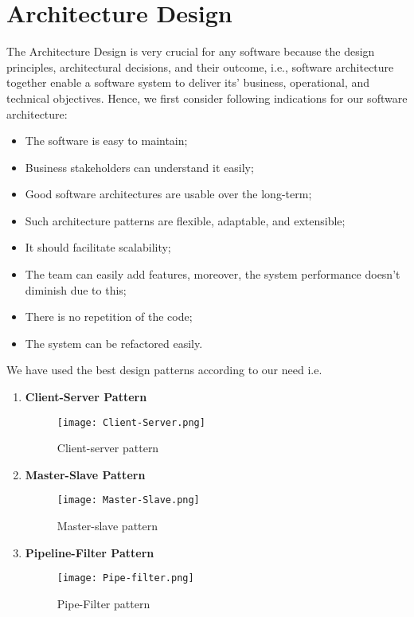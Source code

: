 \documentclass[12pt,oneside,a4paper]{report}
\begin{document}
\section{Architecture Design}
\fontsize{12pt}{10pt}\selectfont
The Architecture Design is very crucial for any software because the design principles, architectural decisions, and their outcome, i.e., software architecture together enable a software system to deliver its’ business, operational, and technical objectives. 
Hence, we first consider following indications for our software architecture:
\begin{itemize}
\item The software is easy to maintain;
\item    Business stakeholders can understand it easily;
\item    Good software architectures are usable over the long-term;
\item    Such architecture patterns are flexible, adaptable, and extensible;
\item    It should facilitate scalability;
\item    The team can easily add features, moreover, the system performance doesn’t diminish due to this;
\item    There is no repetition of the code;
\item    The system can be refactored easily.
\end{itemize}
\newpage
We have used the best design patterns according to our need i.e.\\
\begin{enumerate}
\item\textbf{\Large{Client-Server Pattern}}
\begin{figure}[h]
\centering
\texttt{[image: Client-Server.png]}
\caption{Client-server pattern}
\label{fig_ClientServer}
\end{figure}

\item\textbf{\Large{Master-Slave Pattern}}
\begin{figure}[h]
\centering
\texttt{[image: Master-Slave.png]}
\caption{Master-slave pattern}
\label{fig_MasterSlave}
\end{figure}

\item\textbf{\Large{Pipeline-Filter Pattern}}
\begin{figure}[h]
\centering
\texttt{[image: Pipe-filter.png]}
\caption{Pipe-Filter pattern}
\label{fig_Pipeline}
\end{figure}

\end{enumerate}
\end{document}
